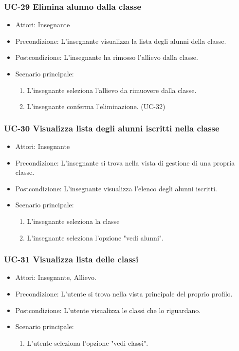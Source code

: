 \subsubsection{UC-29 Elimina alunno dalla classe}		
\begin{itemize}
	\item Attori: Insegnante
	\item Precondizione: L'insegnante visualizza la lista degli alunni della classe.
	\item Postcondizione: L'insegnante ha rimosso l'allievo dalla classe.
	\item Scenario principale:
	\begin{enumerate}
		\item L'insegnante seleziona l'allievo da rimuovere dalla classe.
		\item L'insegnante conferma l'eliminazione. (UC-32)
	\end{enumerate}		
\end{itemize}

\subsubsection{UC-30 Visualizza lista degli alunni iscritti nella classe}		
\begin{itemize}
	\item Attori: Insegnante
	\item Precondizione: L'insegnante si trova nella vista di gestione di una propria classe.
	\item Postcondizione: L'insegnante visualizza l'elenco degli alunni iscritti.
	\item Scenario principale:
	\begin{enumerate}
		\item L'insegnante seleziona la classe
		\item L'insegnante seleziona l'opzione "vedi alunni".
	\end{enumerate}		
\end{itemize}

\subsubsection{UC-31 Visualizza lista delle classi}		
\begin{itemize}
	\item Attori: Insegnante, Allievo.
	\item Precondizione: L'utente si trova nella vista principale del proprio profilo.
	\item Postcondizione: L'utente visualizza le classi che lo riguardano.
	\item Scenario principale:
	\begin{enumerate}
		\item L'utente seleziona l'opzione "vedi classi".
	\end{enumerate}		
\end{itemize}

